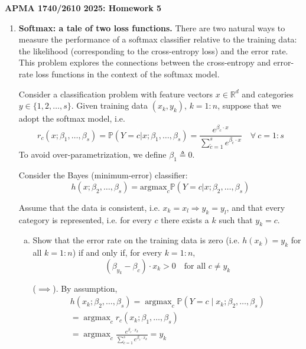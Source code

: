 \documentclass[11pt]{report}
\DeclareMathOperator*{\argmax}{\arg\max}
\renewcommand{\P}{\mathbb{P}}
\begin{document}
\begin{center}
	{\bf\large APMA 1740/2610 2025: Homework 5}
\end{center}
\medskip


\begin{enumerate}[1.]

	\item {\bf Softmax: a tale of two loss functions.}
	      \label{item:two_losses}
	      There are two natural ways to measure the performance of a softmax classifier relative to the training data: the likelihood (corresponding to the cross-entropy loss) and the error rate. This problem explores the connections between the cross-entropy
	      and error-rate loss functions in the context of the softmax model.

	      Consider a classification problem with feature vectors $x\in \mathds{R}^d$ and categories $y\in\{1,2,\ldots,s\}$.
	      Given training data
	      $(x_k,y_k)$, $k=1:n$, suppose that we adopt the softmax model, i.e.
	      \[
		      r_c(x;\beta_1,\ldots,\beta_s)  = \mathds{P}\left(Y=c\big|x;\beta_1,\ldots,\beta_s\right) = \frac{ e^{\beta_c\cdot x} }{ \sum_{\tilde{c} = 1}^s e^{\beta_{\tilde c}\cdot x} }\quad \forall\ c=1:s
	      \]
	      To avoid over-parametrization, we define $\beta_1 \triangleq 0$.

	      Consider the Bayes (minimum-error) classifier:
	      \[
		      h(x;\beta_2,\ldots,\beta_s)  = \text{argmax}_c \mathds{P}\left(Y=c\big|x;\beta_2,\ldots,\beta_s\right)
	      \]

	      Assume that the data is consistent, i.e. $x_k = x_l \Rightarrow y_k=y_l$, and that every category is represented, i.e. for every $c$ there exists a $k$ such that $y_k=c$.

	      \begin{enumerate}[(a)]
		      \item Show that the error rate on the training data is zero (i.e. $h(x_k) = y_k$ for all $k=1:n$) if and only if, for every $k=1:n$,
		            \[
			            (\beta_{y_k} - \beta_c)\cdot x_k > 0\quad \text{for all $c\neq y_k$}
		            \]

		            \color{blue}
		            ($\implies$). By assumption,
		            \begin{align*}
			            h(x_k; \beta_2, \dots, \beta_s) = \argmax_c \P(Y = c \; | \;  x_k; \beta_2, \dots, \beta_s) \\
			            = \argmax_c r_c(x_k; \beta_1, \dots, \beta_s)                                               \\
			            = \argmax_c \frac{e^{\beta_c \cdot x_k}}{\sum_{\tilde{c} = 1}^s e^{\beta_{\tilde c} \cdot x_k}} = y_k
		            \end{align*}


\end{enumerate}
\end{enumerate}
\end{document}
